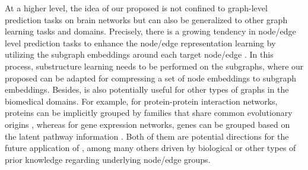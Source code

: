 At a higher level, the idea of our proposed \poolingshort is not confined to graph-level prediction tasks on brain networks but can also be generalized to other graph learning tasks and domains. Precisely, there is a growing tendency in node/edge level prediction tasks to enhance the node/edge representation learning by utilizing the subgraph embeddings around each target node/edge \citep{NEURIPS2021_8462a7c2, linkprediction}. In this process, substructure learning needs to be performed on the subgraphs, where our proposed \poolingshort can be adapted for compressing a set of node embeddings to subgraph embeddings. 
Besides, \poolingshort is also potentially useful for other types of graphs in the biomedical domains. For example, for protein-protein interaction networks, proteins can be implicitly grouped by families that share common evolutionary origins \citep{10.1093/nar/gkaa913}, whereas for gene expression networks, genes can be grouped based on the latent pathway information \citep{kanehisa2000kegg}. Both of them are potential directions for the future application of \poolingshort, among many others driven by biological or other types of prior knowledge regarding underlying node/edge groups.
